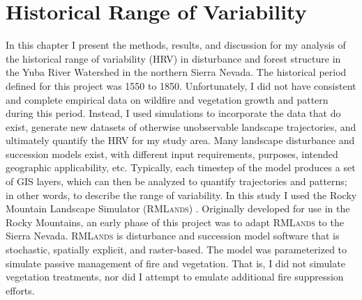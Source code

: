 
\chapter{Historical Range of Variability}
\label{ch:hrv}

In this chapter I present the methods, results, and discussion for my analysis of the historical range of variability (HRV) in disturbance and forest structure in the Yuba River Watershed in the northern Sierra Nevada. The historical period defined for this project was 1550 to 1850. Unfortunately, I did not have consistent and complete empirical data on wildfire and vegetation growth and pattern during this period. Instead, I used simulations to incorporate the data that do exist, generate new datasets of otherwise unobservable landscape trajectories, and ultimately quantify the HRV for my study area. Many landscape disturbance and succession models exist, with different input requirements, purposes, intended geographic applicability, etc. Typically, each timestep of the model produces a set of GIS layers, which can then be analyzed to quantify trajectories and patterns; in other words, to describe the range of variability. In this study I used the Rocky Mountain Landscape Simulator (\textsc{RMLands}) \citep{McGarigal2001}. Originally developed for use in the Rocky Mountains, an early phase of this project was to adapt \textsc{RMLands} to the Sierra Nevada. \textsc{RMLands} is disturbance and succession model software that is stochastic, spatially explicit, and raster-based. The model was parameterized to simulate passive management of fire and vegetation. That is, I did not simulate vegetation treatments, nor did I attempt to emulate additional fire suppression efforts.






